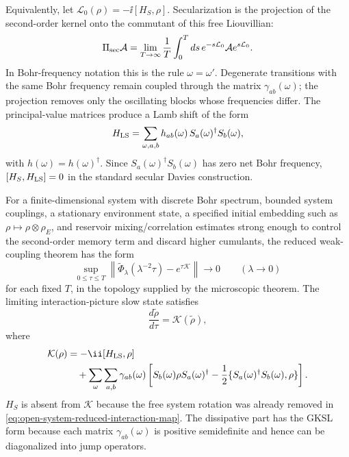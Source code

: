 Equivalently, let \(\mathcal L_0(\rho)=-\ii[H_S,\rho]\).  Secularization is
the projection of the second-order kernel onto the commutant of this free
Liouvillian:
\begin{equation}
  \Pi_{\rm sec}\mathcal A
  =
  \lim_{T\to\infty}
  \frac1T\int_0^T ds\,
  e^{-s\mathcal L_0}\mathcal A e^{s\mathcal L_0}.
  \label{eq:open-system-secular-projection}
\end{equation}
In Bohr-frequency notation this is the rule \(\omega=\omega'\).  Degenerate
transitions with the same Bohr frequency remain coupled through the matrix
\(\gamma_{ab}(\omega)\); the projection removes only the oscillating blocks
whose frequencies differ.  The principal-value matrices produce a Lamb shift
of the form
\[
  H_{\rm LS}
  =
  \sum_{\omega,a,b}
  h_{ab}(\omega)\,
  S_a(\omega)^\dagger S_b(\omega),
\]
with \(h(\omega)=h(\omega)^\dagger\).  Since
\(S_a(\omega)^\dagger S_b(\omega)\) has zero net Bohr frequency,
\([H_S,H_{\rm LS}]=0\) in the standard secular Davies construction.

For a finite-dimensional system with discrete Bohr spectrum, bounded system
couplings, a stationary environment state, a specified initial embedding such
as \(\rho\mapsto\rho\otimes\rho_E\), and reservoir mixing/correlation
estimates strong enough to control the second-order memory term and discard
higher cumulants, the reduced weak-coupling theorem has the form
\begin{equation}
  \sup_{0\le\tau\le T}
  \left\lVert
    \widetilde\Phi_\lambda(\lambda^{-2}\tau)
    -
    e^{\tau\mathcal K}
  \right\rVert
  \longrightarrow0
  \qquad
  (\lambda\to0)
  \label{eq:open-system-davies-map-convergence}
\end{equation}
for each fixed \(T\), in the topology supplied by the microscopic theorem.
The limiting interaction-picture slow state satisfies
\begin{equation}
  \frac{d\widetilde\rho}{d\tau}
  =
  \mathcal K(\widetilde\rho),
  \label{eq:open-system-markov-master-equation}
\end{equation}
where
\begin{align}
  \mathcal K(\rho)
  &=
  -\ii[H_{\rm LS},\rho]
  \nonumber\\
  &\quad+
  \sum_{\omega}\sum_{a,b}\gamma_{ab}(\omega)
  \left[
    S_b(\omega)\rho S_a(\omega)^\dagger
    -\frac12\{S_a(\omega)^\dagger S_b(\omega),\rho\}
  \right].
  \label{eq:open-system-davies-generator}
\end{align}
\(H_S\) is absent from \(\mathcal K\) because the free system rotation was
already removed in \eqref{eq:open-system-reduced-interaction-map}.  The
dissipative part has the GKSL form because each matrix
\(\gamma_{ab}(\omega)\) is positive semidefinite and hence can be diagonalized
into jump operators.

